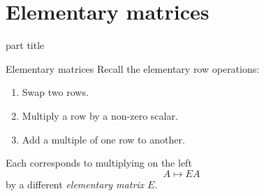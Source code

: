 \documentclass{beamer}
\begin{document}
\section{Elementary matrices}

\begin{frame}
  \begin{beamercolorbox}[sep=12pt,center]{part title}
    \insertsection\par
  \end{beamercolorbox}
\end{frame}


\begin{frame}{Elementary matrices}
  Recall the elementary row operations:\vfill
  \begin{enumerate}
  \item Swap two rows.
  \item Multiply a row by a non-zero scalar.
  \item Add a multiple of one row to another.
  \end{enumerate}\vfill
  Each corresponds to multiplying on the left\vfill
  \begin{equation*}
    A \mapsto EA
  \end{equation*}\vfill
  by a different \emph{elementary matrix $E$}.
\end{frame}
\end{document}
